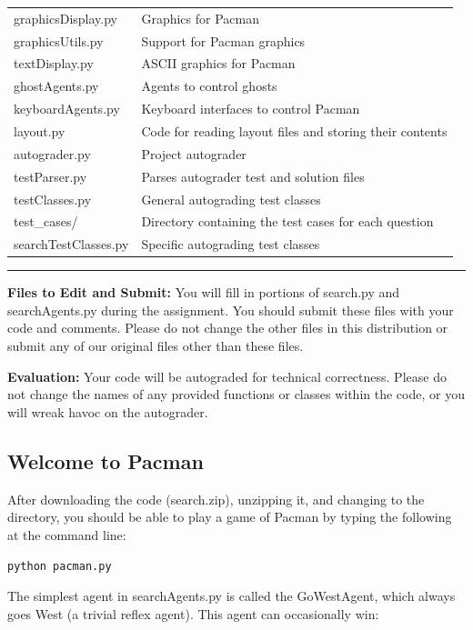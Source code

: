 \documentclass[a4paper, 11pt]{article}
\begin{document}
\begin{tabular}{ll}
  \textsf{graphicsDisplay.py} &	Graphics for Pacman\\
  \textsf{graphicsUtils.py} &	Support for Pacman graphics\\
  \textsf{textDisplay.py} &	ASCII graphics for Pacman\\
  \textsf{ghostAgents.py} &	Agents to control ghosts\\
  \textsf{keyboardAgents.py} &	Keyboard interfaces to control Pacman\\
  \textsf{layout.py} &	Code for reading layout files and storing their contents\\
  \textsf{autograder.py} &	Project autograder\\
  \textsf{testParser.py} &	Parses autograder test and solution files\\
  \textsf{testClasses.py} &	General autograding test classes\\
  \textsf{test\_cases/} &	Directory containing the test cases for each question\\
  \textsf{searchTestClasses.py} &	Specific autograding test classes\\
\end{tabular}

\rule{\textwidth}{0.5pt}

\textbf{Files to Edit and Submit:} You will fill in portions of \textsf{search.py} and \textsf{searchAgents.py} during the assignment. You should submit these files with your code and comments. Please do not change the other files in this distribution or submit any of our original files other than these files.

\textbf{Evaluation:} Your code will be autograded for technical correctness. Please do not change the names of any provided functions or classes within the code, or you will wreak havoc on the autograder.
\subsection{Welcome to Pacman}
After downloading the code (search.zip), unzipping it, and changing to the directory, you should be able to play a game of Pacman by typing the following at the command line:

\texttt{python pacman.py}

The simplest agent in \textsf{searchAgents.py} is called the \textsf{GoWestAgent}, which always goes West (a trivial reflex agent). This agent can occasionally win:
\end{document}
